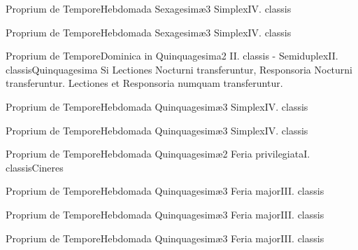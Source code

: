 \documentclass[liber-responsorialis_hiemalis.tex]{subfiles}
\begin{document}
	{Proprium de Tempore}{Hebdomada Sexagesimæ}{3}{}
	{Simplex}{IV. classis}{}
	{}
	{}

	{Proprium de Tempore}{Hebdomada Sexagesimæ}{3}{}
	{Simplex}{IV. classis}{}
	{}
	{}

	{Proprium de Tempore}{Dominica in Quinquagesima}{2}{}
	{II. classis - Semiduplex}{II. classis}{Quinquagesima}
	{Si Lectiones  Nocturni transferuntur, Responsoria  Nocturni transferuntur.}
	{Lectiones et Responsoria numquam transferuntur.}

	{Proprium de Tempore}{Hebdomada Quinquagesimæ}{3}{}
	{Simplex}{IV. classis}{}
	{}
	{}

	{Proprium de Tempore}{Hebdomada Quinquagesimæ}{3}{}
	{Simplex}{IV. classis}{}
	{}
	{}

	{Proprium de Tempore}{Hebdomada Quinquagesimæ}{2}{}
	{Feria privilegiata}{I. classis}{Cineres}
	{}
	{}

	{Proprium de Tempore}{Hebdomada Quinquagesimæ}{3}{}
	{Feria major}{III. classis}{}
	{}
	{}

	{Proprium de Tempore}{Hebdomada Quinquagesimæ}{3}{}
	{Feria major}{III. classis}{}
	{}
	{}

	{Proprium de Tempore}{Hebdomada Quinquagesimæ}{3}{}
	{Feria major}{III. classis}{}
	{}
	{}
\end{document}
